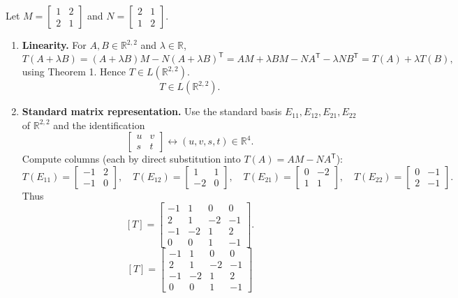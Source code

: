 \documentclass[12pt]{article}
\newcommand{\R}{\mathbb{R}}
\begin{document}
Let $M=\begin{bmatrix}1&2\\2&1\end{bmatrix}$ and $N=\begin{bmatrix}2&1\\1&2\end{bmatrix}$.
\medskip
\begin{enumerate}[label=(\alph*)]
\item \textbf{Linearity.}
For $A,B\in\R^{2,2}$ and $\lambda\in\R$,
\[
T(A+\lambda B)=(A+\lambda B)M-N(A+\lambda B)^{\mathsf T}
=AM+\lambda BM-NA^{\mathsf T}-\lambda NB^{\mathsf T}=T(A)+\lambda T(B),
\]
using Theorem 1. Hence $T\in L(\R^{2,2})$.
\[
\boxed{\,T\in L(\R^{2,2}).\,}
\]

\item \textbf{Standard matrix representation.}
Use the standard basis $E_{11},E_{12},E_{21},E_{22}$ of $\R^{2,2}$ and the identification
\[
\begin{bmatrix}u&v\\s&t\end{bmatrix}\leftrightarrow (u,v,s,t)\in\R^4.
\]
Compute columns (each by direct substitution into $T(A)=AM-NA^{\mathsf T}$):
\[
T(E_{11})=\begin{bmatrix}-1&2\\-1&0\end{bmatrix},\quad
T(E_{12})=\begin{bmatrix}1&1\\-2&0\end{bmatrix},\quad
T(E_{21})=\begin{bmatrix}0&-2\\1&1\end{bmatrix},\quad
T(E_{22})=\begin{bmatrix}0&-1\\2&-1\end{bmatrix}.
\]
Thus
\[
[T]=
\begin{bmatrix}
-1&1&0&0\\
2&1&-2&-1\\
-1&-2&1&2\\
0&0&1&-1
\end{bmatrix}.
\]
\[
\boxed{\, [T]=
\begin{bmatrix}
-1&1&0&0\\
2&1&-2&-1\\
-1&-2&1&2\\
0&0&1&-1
\end{bmatrix}\,}
\]


\end{enumerate}
\end{document}
